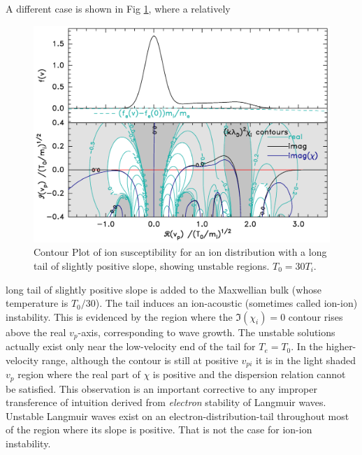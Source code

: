 \documentclass[12pt]{article}
\begin{document}
A different case is shown in Fig \ref{flattail}, where a relatively
\begin{figure}[htp]
  \center\includegraphics[width=0.8\hsize]{flattailion}\endcenter
  \caption{Contour Plot of ion susceptibility for an ion distribution with
    a long tail of slightly positive slope, showing unstable
    regions. $T_0=30T_i$. \label{flattail}}
\end{figure}
long tail of slightly positive slope is added to the Maxwellian bulk
(whose temperature is $T_0/30$). The tail induces an ion-acoustic
(sometimes called ion-ion) instability. This is evidenced by the
region where the $\Im(\chi_i)=0$ contour rises above the real $v_p$-axis,
corresponding to wave growth. The unstable solutions actually exist
only near the low-velocity end of the tail for $T_e=T_0$. In the
higher-velocity range, although the contour is still at positive
$v_{pi}$ it is in the light shaded $v_p$ region where the real part of
$\chi$ is positive and the dispersion relation cannot be
satisfied. This observation is an important corrective to any improper
transference of intuition derived from \emph{electron} stability of
Langmuir waves. Unstable Langmuir waves exist on an
electron-distribution-tail throughout most of the region where its slope is
positive. That is not the case for ion-ion instability. 
\end{document}
